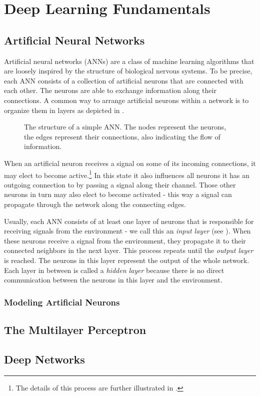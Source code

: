 \chapter{Deep Learning Fundamentals}

\section{Artificial Neural Networks}

Artificial neural networks (ANNs) are a class of machine learning algorithms
that are loosely inspired by the structure of biological nervous
systems.
To be precise, each ANN consists of a collection of artificial neurons
that are connected with each other. The neurons are able to exchange
information along their connections.
A common way to arrange artificial neurons within a network is to organize
them in layers as depicted in .
\begin{figure}[h]
  \centering
  \resizebox{0.75\textwidth}{!}{}
  \caption{The structure of a simple ANN. The nodes represent the
    neurons, the edges represent their connections, also indicating
    the flow of information.}
  \label{fig:basic-network}
\end{figure}

When an artificial neuron receives a signal on some of its
incoming connections, it may elect to become active.\footnote{The
  details of this
  process are further illustrated in .}
In this state it also influences all neurons it has an outgoing
connection to by passing a signal along their
channel. Those other neurons in turn may also elect to become
activated - this way a signal can propagate through the network along
the connecting edges.

Usually, each ANN consists of at least one layer of neurons that is
responsible for receiving signals from the environment - we call this
an \textit{input layer} (see ). When these neurons
receive a signal from the environment, they propagate it to their
connected neighbors in the next layer. This process repeats until the
\textit{output layer} is reached. The neurons in this layer represent the
output of the whole network. Each layer in between is called a \textit{hidden
layer} because there is no direct communication between the neurons in
this layer and the environment.

\subsection{Modeling Artificial Neurons}
\label{sec:artificial-neurons}

\section{The Multilayer Perceptron}

\section{Deep Networks}
